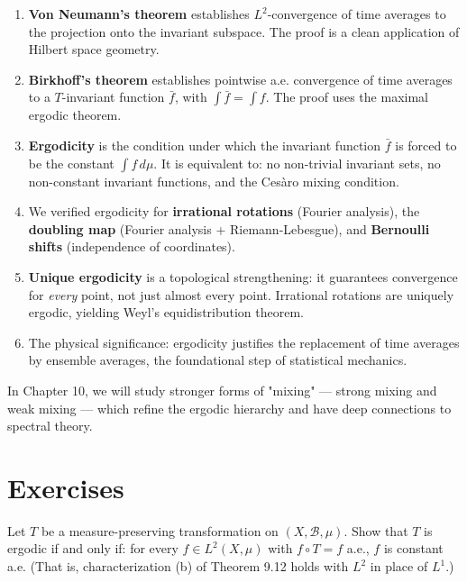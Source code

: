 \begin{enumerate}[nosep]
  \item \textbf{Von Neumann's theorem} establishes $L^2$-convergence of time averages to the projection onto the invariant subspace. The proof is a clean application of Hilbert space geometry.

  \item \textbf{Birkhoff's theorem} establishes pointwise a.e. convergence of time averages to a $T$-invariant function $\bar{f}$, with $\int \bar{f} = \int f$. The proof uses the maximal ergodic theorem.

  \item \textbf{Ergodicity} is the condition under which the invariant function $\bar{f}$ is forced to be the constant $\int f \, d\mu$. It is equivalent to: no non-trivial invariant sets, no non-constant invariant functions, and the Cesàro mixing condition.

  \item We verified ergodicity for \textbf{irrational rotations} (Fourier analysis), the \textbf{doubling map} (Fourier analysis + Riemann-Lebesgue), and \textbf{Bernoulli shifts} (independence of coordinates).

  \item \textbf{Unique ergodicity} is a topological strengthening: it guarantees convergence for \textit{every} point, not just almost every point. Irrational rotations are uniquely ergodic, yielding Weyl's equidistribution theorem.

  \item The physical significance: ergodicity justifies the replacement of time averages by ensemble averages, the foundational step of statistical mechanics.
\end{enumerate}

In Chapter 10, we will study stronger forms of "mixing" --- strong mixing and weak mixing --- which refine the ergodic hierarchy and have deep connections to spectral theory.


\section*{Exercises}

\begin{exercise}
Let $T$ be a measure-preserving transformation on $(X, \mathcal{B}, \mu)$. Show that $T$ is ergodic if and only if: for every $f \in L^2(X, \mu)$ with $f \circ T = f$ a.e., $f$ is constant a.e. (That is, characterization (b) of Theorem 9.12 holds with $L^2$ in place of $L^1$.)
\end{exercise}


